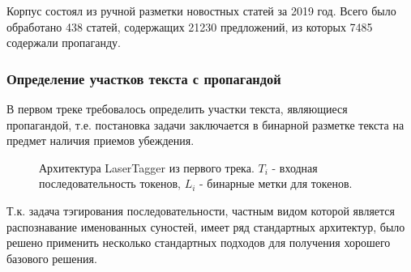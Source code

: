 Корпус состоял из ручной разметки новостных статей за 2019 год. Всего было обработано 438 статей, содержащих 21230 предложений, из которых 7485 содержали пропаганду.

\subsubsection{Определение участков текста с пропагандой}
В первом треке требовалось определить участки текста, являющиеся пропагандой, т.е. постановка задачи заключается в бинарной разметке текста на предмет наличия приемов убеждения. 

\begin{figure}[H]
 \caption{Архитектура LaserTagger из первого трека. $T_i$ - входная последовательность токенов, $L_i$ - бинарные метки для токенов.}
\end{figure}

Т.к. задача тэгирования последовательности, частным видом которой является распознавание именованных суностей, имеет ряд стандартных архитектур, было решено применить несколько стандартных подходов для получения хорошего базового решения.

